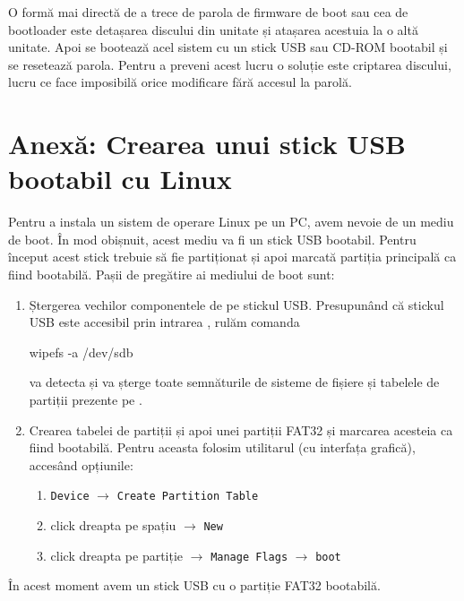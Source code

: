 O formă mai directă de a trece de parola de firmware de boot sau cea de bootloader este detașarea discului din unitate și atașarea acestuia la o altă unitate.
Apoi se bootează acel sistem cu un stick USB sau CD-ROM bootabil și se resetează parola.
Pentru a preveni acest lucru o soluție este criptarea discului, lucru ce face imposibilă orice modificare fără accesul la parolă.

\section{Anexă: Crearea unui stick USB bootabil cu Linux}
\label{sec:boot:usb-linux}

Pentru a instala un sistem de operare Linux pe un PC, avem nevoie de un mediu de boot.
În mod obișnuit, acest mediu va fi un stick USB bootabil.
Pentru început acest stick trebuie să fie partiționat și apoi marcată partiția principală ca fiind bootabilă.
Pașii de pregătire ai mediului de boot sunt:

\begin{enumerate}
  \item Ștergerea vechilor componentele de pe stickul USB.
    Presupunând că stickul USB este accesibil prin intrarea , rulăm comanda

\begin{screen}
wipefs -a /dev/sdb
\end{screen}

     va detecta și va șterge toate semnăturile de sisteme de fișiere și tabelele de partiții prezente pe .

  \item Crearea tabelei de partiții și apoi unei partiții FAT32 și marcarea acesteia ca fiind bootabilă.
    Pentru aceasta folosim utilitarul  (cu interfața grafică), accesând opțiunile:
    \begin{enumerate}
      \item \texttt{Device} $\rightarrow$ \texttt{Create Partition Table}
      \item click dreapta pe spațiu $\rightarrow$ \texttt{New}
      \item click dreapta pe partiție $\rightarrow$ \texttt{Manage Flags} $\rightarrow$ \texttt{boot}
    \end{enumerate}
\end{enumerate}

În acest moment avem un stick USB cu o partiție FAT32 bootabilă.

